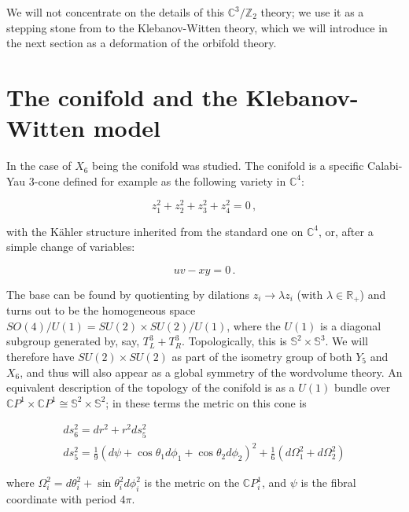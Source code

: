We will not concentrate on the details of this $\mathbb{C}^3/\mathbb{Z}_2$ theory; we use it as a stepping stone from \SYM to the Klebanov-Witten theory, which we will introduce in the next section as a deformation of the orbifold theory.

\section{The conifold and the Klebanov-Witten model} \label{sec:KW}

In \cite{KW_SCFT} the case of $X_6$ being the conifold was studied. The conifold is a specific Calabi-Yau 3-cone defined for example as the following variety in $\mathbb{C}^4$:

\begin{equation}
	z_1^2 + z_2^2 + z_3^2 + z_4^2 = 0\,,
\end{equation}

with the K\"ahler structure inherited from the standard one on $\mathbb{C}^4$, or, after a simple change of variables:

\begin{equation}
	u v - xy = 0\,.
	\label{conifoldeq}
\end{equation}

The base can be found by quotienting by dilations $z_i \rightarrow \lambda z_i$ (with $\lambda \in \mathbb{R}_+$) and turns out to be the homogeneous space $SO(4)/U(1) = SU(2)\times SU(2) / U(1)$, where the $U(1)$ is a diagonal subgroup generated by, say, $T^3_L + T^3_R$. Topologically, this is $\mathbb{S}^2 \times \mathbb{S}^3$. We will therefore have $SU(2)\times SU(2)$ as part of the isometry group of both $Y_5$ and $X_6$, and thus will also appear as a global symmetry of the wordvolume theory. An equivalent description of the topology of the conifold is as a $U(1)$ bundle over $\mathbb{C}P^1 \times \mathbb{C}P^1 \cong \mathbb{S}^2 \times \mathbb{S}^2$; in these terms the metric on this cone is

\begin{gather}
	ds^2_6 = dr^2 + r^2 ds^2_5 \nonumber\\
	ds^2_5 = \frac{1}{9} (d\psi + \cos\theta_1 d\phi_1 + \cos\theta_2 d\phi_2)^2 + \frac{1}{6} (d\Omega_1^2 + d\Omega_2^2)\label{conifoldmetric}
\end{gather}

where $\Omega_i^2 = d\theta_i^2 + \sin\theta_i^2 d\phi_i^2$ is the metric on the $\mathbb{C}P^1_i$, and $\psi$ is the fibral coordinate with period $4\pi$.

